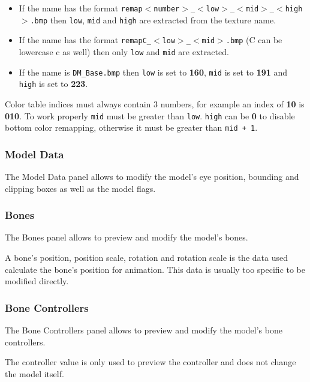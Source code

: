 \documentclass[10pt, a4paper, titlepage, oneside]{article}
\newcommand{\code}[1]{\mbox{\texttt{#1}}}
\begin{document}
\begin{itemize}
\item If the name has the format \code{remap$<$number$>$\_$<$low$>$\_$<$mid$>$\_$<$high$>$.bmp} then \code{low}, \code{mid} and \code{high} are extracted from the texture name.
\item If the name has the format \code{remapC\_$<$low$>$\_$<$mid$>$.bmp} (C can be lowercase c as well) then only \code{low} and \code{mid} are extracted.
\item If the name is \code{DM\_Base.bmp} then \code{low} is set to \textbf{160}, \code{mid} is set to \textbf{191} and \code{high} is set to \textbf{223}.
\end{itemize}

Color table indices must always contain 3 numbers, for example an index of \textbf{10} is \textbf{010}. To work properly \code{mid} must be greater than \code{low}. \code{high} can be \textbf{0} to disable bottom color remapping, otherwise it must be greater than \code{mid + 1}.

\subsubsection{Model Data}

The Model Data panel allows to modify the model's eye position, bounding and clipping boxes as well as the model flags.

\subsubsection{Bones}

The Bones panel allows to preview and modify the model's bones.

\vspace{\baselineskip}
A bone's position, position scale, rotation and rotation scale is the data used calculate the bone's position for animation. This data is usually too specific to be modified directly.

\subsubsection{Bone Controllers}

The Bone Controllers panel allows to preview and modify the model's bone controllers.

\vspace{\baselineskip}
The controller value is only used to preview the controller and does not change the model itself.
\end{document}
